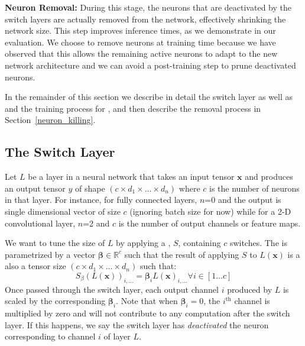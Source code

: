 \noindent\textbf{Neuron Removal: } During this stage, the neurons that are
deactivated by the switch layers are actually removed from the network,
effectively shrinking the network size. This step improves inference times, as
we demonstrate in our evaluation. We choose to remove neurons at training time
because we have observed that this allows the remaining active neurons to adapt
to the new network architecture and we can avoid a post-training step to prune
deactivated neurons.

In the remainder of this section we describe in detail the switch layer as well
as and the training process for \shrink, and 
then describe the removal process in Section~\ref{neuron_killing}.

\subsection{The Switch Layer}

Let $L$ be a layer in a neural network that takes an input tensor $\bm{x}$ and
produces an output tensor $y$ of shape $\left(c \times d_1 \times \dots \times
d_n\right)$ where $c$ is the number of neurons in that layer.  For instance, for
fully connected layers, $n$=0 and the output is single dimensional vector of size $c$
(ignoring batch size for now) while for a 2-D convolutional layer, $n$=2 and $c$
is the number of output channels or feature maps.

We want to tune the size of $L$ by applying a \swl, $S$, containing $c$
switches.  The \swl is parametrized by a vector $\bm{\beta} \in \mathbb{R}^c$ such that the result
of applying $S$ to $L(\bm{x})$ is a also a tensor size $\left(c \times d_1
\times \dots \times d_n\right)$ such that: 
\begin{equation} 
S_{\beta}(L(\bm{x}))_{i,...} = \bm{\beta}_iL(\bm{x})_{i, ...} \forall i \in [1\ldots c]
\end{equation}
Once passed through the switch layer, each output channel $i$
produced by $L$ is scaled by the corresponding $\bm{\beta}_i$. Note that when
$\bm{\beta}_i = 0$, the $i^{\text{th}}$ channel is multiplied by zero and will not
contribute to any computation after the switch layer. If this happens, we say
the switch layer has {\it deactivated} the neuron corresponding to channel $i$ of layer $L$.

